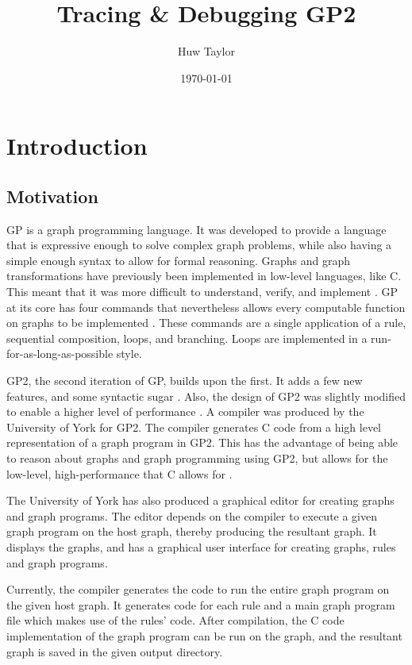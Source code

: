 \documentclass{UoYCSproject}
\author{Huw Taylor}
\title{Tracing \& Debugging GP2}
\date{\today}
\begin{document}
\maketitle

\tableofcontents

\chapter{Introduction}
\section{Motivation}
GP is a graph programming language. It was developed to provide a language that is expressive enough to solve complex graph problems, while also having a simple enough syntax to allow for formal reasoning. Graphs and graph transformations have previously been implemented in low-level languages, like C. This meant that it was more difficult to understand, verify, and implement \cite{gp_lang}. GP at its core has four commands that nevertheless allows every computable function on graphs to be implemented \cite{gp1}. These commands are a single application of a rule, sequential composition, loops, and branching. Loops are implemented in a run-for-as-long-as-possible style.

GP2, the second iteration of GP, builds upon the first. It adds a few new features, and some syntactic sugar \cite{gp2_design}. Also, the design of GP2 was slightly modified to enable a higher level of performance \citep{chris_compiler}. A compiler was produced by the University of York for GP2. The compiler generates C code from a high level representation of a graph program in GP2. This has the advantage of being able to reason about graphs and graph programming using GP2, but allows for the low-level, high-performance that C allows for \citep{compiling_gp2}.

The University of York has also produced a graphical editor for creating graphs and graph programs. The editor depends on the compiler to execute a given graph program on the host graph, thereby producing the resultant graph. It displays the graphs, and has a graphical user interface for creating graphs, rules and graph programs.

Currently, the compiler generates the code to run the entire graph program on the given host graph. It generates code for each rule and a main graph program file which makes use of the rules' code. After compilation, the C code implementation of the graph program can be run on the graph, and the resultant graph is saved in the given output directory.
\end{document}
